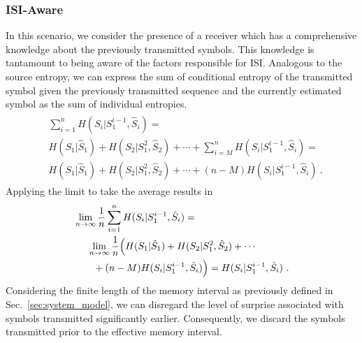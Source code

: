 \documentclass[journal]{IEEEtranTCOM}
\begin{document}
\subsubsection{ISI-Aware}
In this scenario, we consider the presence of a receiver which has a comprehensive knowledge about the previously transmitted symbols. This knowledge is tantamount to being aware of the factors responsible for ISI. Analogous to the source entropy, we can express the sum of conditional entropy of the transmitted symbol given the previously transmitted sequence and the currently estimated symbol as the sum of individual entropies.
\begin{align}
    \begin{split}
        &\sum_{i=1}^{n} H(S_{i}|S_{1}^{i-1},\hat{S}_{i}) = \\& H(S_{1}|\hat{S}_{1})+H(S_{2}|S_{1}^{2},\hat{S}_{2}) + \cdots+\sum_{i=M}^{n} H(S_{i}|S_{1}^{i-1},\hat{S}_{i}) 
    =\\& H(S_{1}|\hat{S}_{1})+H(S_{2}|S_{1}^{2},\hat{S}_{2}) + \cdots+(n-M)H(S_{i}|S_{1}^{i-1},\hat{S}_{i})~.
    \end{split}
\end{align}
Applying the limit to take the average results in
\begin{align}
\begin{split}
    &\lim_{n\to\infty}\frac{1}{n}\sum_{i=1}^{n} H(S_{i}|S_{1}^{i-1},\hat{S}_{i}) =\\&\hspace{0.5cm} \lim_{n\to\infty}\frac{1}{n} \Big(H(S_{1}|\hat{S}_{1})+H(S_{2}|S_{1}^{2},\hat{S}_{2}) + \cdots\\&\hspace{0.7cm}+(n-M)H(S_{i}|S_{1}^{i-1},\hat{S}_{i})\Big)=
    H(S_{i}|S_{1}^{i-1},\hat{S}_{i})~.
\end{split}
\end{align}
Considering the finite length of the memory interval as previously defined in Sec.~\ref{sec:system_model}, we can disregard the level of surprise associated with symbols transmitted significantly earlier. Consequently, we discard the symbols transmitted prior to the effective memory interval.
\end{document}
